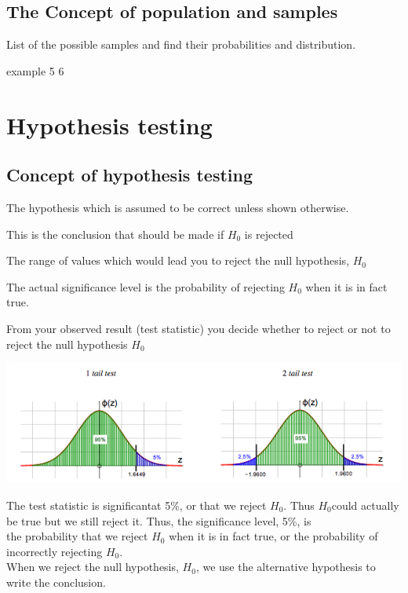 \documentclass[a4paper]{article}
\begin{document}
\subsection{The Concept of population and samples}
List of the possible samples and find their probabilities and distribution.
\begin{eg}
	example 5 6
\end{eg}

\section{Hypothesis testing}
\subsection{Concept of hypothesis testing}
\begin{defi}
	The hypothesis which is assumed to be correct unless shown otherwise.
\end{defi}
\begin{defi}
	This is the conclusion that should be made if $H_0$ is rejected
\end{defi}

\begin{defi}
	The range of values which would lead you to reject the null hypothesis, $H_0$
\end{defi}

\begin{defi}
	The actual significance level is the probability of rejecting $H_0$ when it is in fact true.
\end{defi}
From your observed result (test statistic) you decide whether to reject or not to reject the null
hypothesis $H_0$
\begin{center}
	\includegraphics[scale=0.5]{img_S/15_intro}
\end{center}

The test statistic is significantat 5\%, or that we reject $H_0$. Thus $H_0$could actually be true but we still reject it.
Thus, the significance level, 5\%, is  \\
the probability that we reject $H_0$ when it is in fact true, or the probability of incorrectly rejecting $H_0$.\\
When we reject the null hypothesis, $H_0$, we use the alternative hypothesis to write the conclusion.\\
\end{document}
